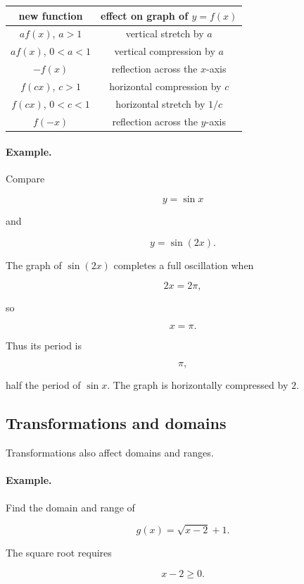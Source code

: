 \begin{center}
\renewcommand{\arraystretch}{1.6}
\begin{tabular}{c|c}
\textbf{new function} & \textbf{effect on graph of \(y=f(x)\)} \\ \hline
\(af(x)\), \(a>1\) & vertical stretch by \(a\) \\
\(af(x)\), \(0<a<1\) & vertical compression by \(a\) \\
\(-f(x)\) & reflection across the \(x\)-axis \\
\(f(cx)\), \(c>1\) & horizontal compression by \(c\) \\
\(f(cx)\), \(0<c<1\) & horizontal stretch by \(1/c\) \\
\(f(-x)\) & reflection across the \(y\)-axis
\end{tabular}
\end{center}

\paragraph{Example.}
Compare

\[
y=\sin x
\]

and

\[
y=\sin(2x).
\]

The graph of \(\sin(2x)\) completes a full oscillation when

\[
2x=2\pi,
\]

so

\[
x=\pi.
\]

Thus its period is

\[
\pi,
\]

half the period of \(\sin x\).  The graph is horizontally compressed by \(2\).

\subsection{Transformations and domains}
\label{appsubsec:transformations-domains}

Transformations also affect domains and ranges.

\paragraph{Example.}
Find the domain and range of

\[
g(x)=\sqrt{x-2}+1.
\]

The square root requires

\[
x-2\ge0.
\]


